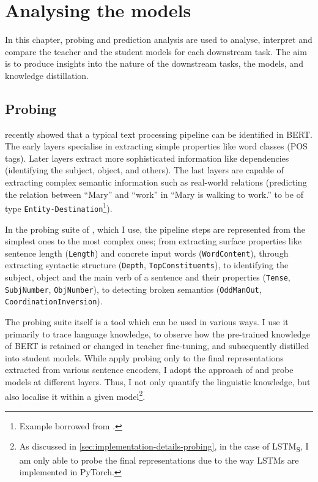 \documentclass[bsc,frontabs,singlespacing,parskip,deptreport]{infthesis}
\def\LSTMS{LSTM\textsubscript{S}}
\begin{document}
\chapter{Analysing the models}{
  In this chapter, probing and prediction analysis are used to analyse, interpret and compare the teacher and the student models for each downstream task. 
  The aim is to produce insights into the nature of the downstream tasks, the models, and knowledge distillation.

  \section{Probing}{
    \citet{Tenney_2019b} recently showed that a typical text processing pipeline can be identified in BERT. The early layers specialise in extracting simple properties like word classes (POS tags).
    Later layers extract more sophisticated information like dependencies (identifying the subject, object, and others).
    The last layers are capable of extracting complex semantic information such as real-world relations (predicting the relation between ``Mary'' and ``work'' in ``Mary is walking to work.'' to be of type \verb|Entity-Destination|\footnote{Example borrowed from \citet[p. 4]{Tenney_2019a}.}).
    
    In the probing suite of \citet{Conneau_2018}, which I use, the pipeline steps are represented from the simplest ones to the most complex ones; from extracting surface properties like sentence length (\verb|Length|) and concrete input words (\verb|WordContent|), through extracting syntactic structure (\verb|Depth|, \verb|TopConstituents|), to identifying the subject, object and the main verb of a sentence and their properties (\verb|Tense|, \verb|SubjNumber|, \verb|ObjNumber|), to detecting broken semantics (\verb|OddManOut|, \verb|CoordinationInversion|).

    The probing suite itself is a tool which can be used in various ways. I use it primarily to trace language knowledge, to observe how the pre-trained knowledge of BERT is retained or changed in teacher fine-tuning, and subsequently distilled into student models.
    While \citeauthor{Conneau_2018} apply probing only to the final representations extracted from various sentence encoders, I adopt the approach of \citeauthor{Tenney_2019b} and probe models at different layers. Thus, I not only quantify the linguistic knowledge, but also localise it within a given model\footnote{As discussed in \autoref{sec:implementation-details-probing}, in the case of \LSTMS, I am only able to probe the final representations due to the way LSTMs are implemented in PyTorch.}.
    
}}
\end{document}
